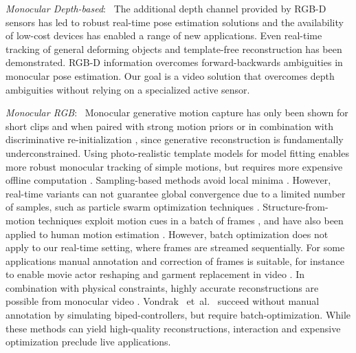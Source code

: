 \documentclass[acmtog]{acmart}
\newcommand{\parahead}[1]{\vspace{5pt}\noindent\emph{#1}:\ }
\newcommand{\etal}{~et~al.\ }
\begin{document}
\parahead{Monocular Depth-based}
The additional depth channel provided by \mbox{RGB-D} sensors has led to robust real-time pose estimation solutions \cite{baak_posedepth_iccv11,ganapathi2012real,wei_single-rgbd_tog12,shotton2013real,ma2014realtime,ye_single-rgbd_cvpr14} and the availability of low-cost devices has enabled a range of new applications. Even real-time tracking of general deforming objects \cite{zollhoefer2014deformable} and template-free reconstruction \cite{newcombe2015dynamic,innmann2016volume,orts2016holoportation,dou2016fusion4d} has been demonstrated.
\mbox{RGB-D} information overcomes forward-backwards ambiguities in monocular pose estimation.
Our goal is a video solution that overcomes depth ambiguities without relying on a specialized active sensor.

\parahead{Monocular RGB}
Monocular generative motion capture has only been shown for short clips and when paired with strong motion priors \cite{urtasun_temporal_cviu2006} or in combination with discriminative re-initialization \cite{sminchisescu_learning_cvpr2006,rosales2006combining}, since generative reconstruction is fundamentally underconstrained.
Using photo-realistic template models for model fitting enables more robust monocular tracking of simple motions, but requires more expensive offline computation \cite{de2008model}.
Sampling-based methods avoid local minima \cite{deutscher2005articulated,balan2005quantitative,gall_optimization_ijcv2010,bo2010twin}. However, real-time variants can not guarantee global convergence due to a limited number of samples, such as particle swarm optimization techniques \cite{oikonomidis2011efficient}.
Structure-from-motion techniques exploit motion cues in a batch of frames \cite{garg2013dense}, and have also been applied to human motion estimation \cite{gotardo2011computing,lee2013procrustean,park20113d,zhu20113d}.
However, batch optimization does not apply to our real-time setting, where frames are streamed sequentially.
For some applications manual annotation and correction of frames is suitable, for instance to enable movie actor reshaping \cite{jain2010movie} and garment replacement in video \cite{rogge2014garment}. In combination with physical constraints, highly accurate reconstructions are possible from monocular video \cite{wei2010videomocap}. 
Vondrak \etal {} succeed without manual annotation by simulating biped-controllers, but require batch-optimization.
While these methods can yield high-quality reconstructions, interaction and expensive optimization preclude live applications.
\end{document}
